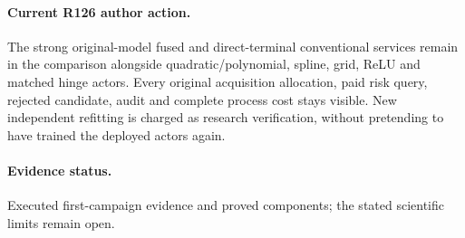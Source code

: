 \paragraph{Current R126 author action.} The strong original-model fused and direct-terminal conventional services remain in the comparison alongside quadratic/polynomial, spline, grid, ReLU and matched hinge actors. Every original acquisition allocation, paid risk query, rejected candidate, audit and complete process cost stays visible. New independent refitting is charged as research verification, without pretending to have trained the deployed actors again.

\paragraph{Evidence status.} Executed first-campaign evidence and proved components; the stated scientific limits remain open.


